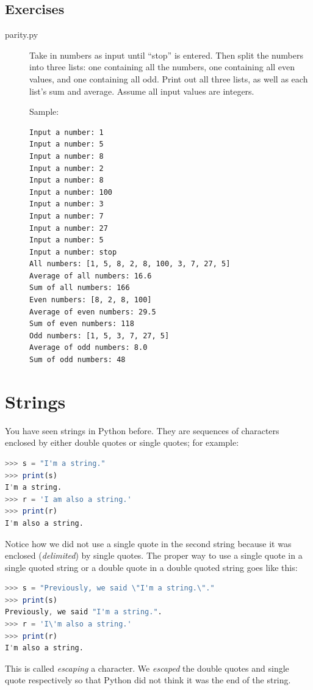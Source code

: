 \documentclass[11pt]{cselabheader}
\begin{document}
\subsection{Exercises}
\label{subsec:listsex}

\begin{description}
  \item[parity.py] Take in numbers as input until ``stop'' is entered. Then split the numbers into three lists: one containing all the numbers, one containing all even values, and one containing all odd. Print out all three lists, as well as each list's sum and average. Assume all input values are integers.

    Sample:
\begin{lstlisting}[style=bash]
Input a number: 1
Input a number: 5
Input a number: 8
Input a number: 2
Input a number: 8
Input a number: 100
Input a number: 3
Input a number: 7
Input a number: 27
Input a number: 5
Input a number: stop
All numbers: [1, 5, 8, 2, 8, 100, 3, 7, 27, 5]
Average of all numbers: 16.6
Sum of all numbers: 166
Even numbers: [8, 2, 8, 100]
Average of even numbers: 29.5
Sum of even numbers: 118
Odd numbers: [1, 5, 3, 7, 27, 5]
Average of odd numbers: 8.0
Sum of odd numbers: 48
\end{lstlisting}
\end{description}

\pagebreak
\section{Strings}

You have seen strings in Python before. They are sequences of characters
enclosed by either double quotes or single quotes; for example:
\begin{lstlisting}[style=ipython,language=Octave] % string escaping issues with Python style
>>> s = "I'm a string."
>>> print(s)
I'm a string.
>>> r = 'I am also a string.'
>>> print(r)
I'm also a string.
\end{lstlisting}

Notice how we did not use a single quote in the second string because it was
enclosed (\emph{delimited}) by single quotes. The proper way to use a single
quote in a single quoted string or a double quote in a double quoted string
goes like this:
\begin{lstlisting}[style=ipython,language=Octave]
>>> s = "Previously, we said \"I'm a string.\"."
>>> print(s)
Previously, we said "I'm a string.".
>>> r = 'I\'m also a string.'
>>> print(r)
I'm also a string.
\end{lstlisting}
This is called \emph{escaping} a character. We \emph{escaped} the double quotes
and single quote respectively so that Python did not think it was the end of
the string.
\end{document}
